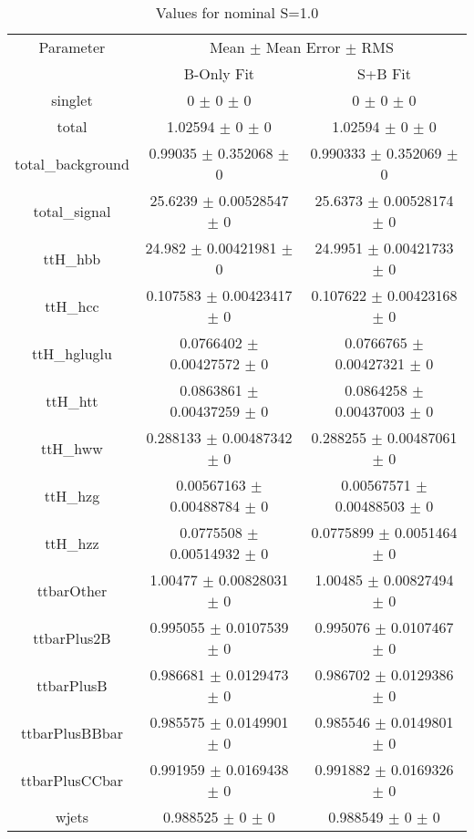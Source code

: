 \begin{table}
\centering
\caption{Values for nominal S=1.0}
\begin{tabular}{ccc}
\toprule
Parameter & \multicolumn{2}{c}{Mean $\pm$ Mean Error $\pm$ RMS}\\
 & B-Only Fit & S+B Fit\\
\midrule
singlet & \num{0} $\pm$ \num{0} $\pm$ \num{0} & \num{0} $\pm$ \num{0} $\pm$ \num{0}\\
total & \num{1.02594} $\pm$ \num{0} $\pm$ \num{0} & \num{1.02594} $\pm$ \num{0} $\pm$ \num{0}\\
total\_background & \num{0.99035} $\pm$ \num{0.352068} $\pm$ \num{0} & \num{0.990333} $\pm$ \num{0.352069} $\pm$ \num{0}\\
total\_signal & \num{25.6239} $\pm$ \num{0.00528547} $\pm$ \num{0} & \num{25.6373} $\pm$ \num{0.00528174} $\pm$ \num{0}\\
ttH\_hbb & \num{24.982} $\pm$ \num{0.00421981} $\pm$ \num{0} & \num{24.9951} $\pm$ \num{0.00421733} $\pm$ \num{0}\\
ttH\_hcc & \num{0.107583} $\pm$ \num{0.00423417} $\pm$ \num{0} & \num{0.107622} $\pm$ \num{0.00423168} $\pm$ \num{0}\\
ttH\_hgluglu & \num{0.0766402} $\pm$ \num{0.00427572} $\pm$ \num{0} & \num{0.0766765} $\pm$ \num{0.00427321} $\pm$ \num{0}\\
ttH\_htt & \num{0.0863861} $\pm$ \num{0.00437259} $\pm$ \num{0} & \num{0.0864258} $\pm$ \num{0.00437003} $\pm$ \num{0}\\
ttH\_hww & \num{0.288133} $\pm$ \num{0.00487342} $\pm$ \num{0} & \num{0.288255} $\pm$ \num{0.00487061} $\pm$ \num{0}\\
ttH\_hzg & \num{0.00567163} $\pm$ \num{0.00488784} $\pm$ \num{0} & \num{0.00567571} $\pm$ \num{0.00488503} $\pm$ \num{0}\\
ttH\_hzz & \num{0.0775508} $\pm$ \num{0.00514932} $\pm$ \num{0} & \num{0.0775899} $\pm$ \num{0.0051464} $\pm$ \num{0}\\
ttbarOther & \num{1.00477} $\pm$ \num{0.00828031} $\pm$ \num{0} & \num{1.00485} $\pm$ \num{0.00827494} $\pm$ \num{0}\\
ttbarPlus2B & \num{0.995055} $\pm$ \num{0.0107539} $\pm$ \num{0} & \num{0.995076} $\pm$ \num{0.0107467} $\pm$ \num{0}\\
ttbarPlusB & \num{0.986681} $\pm$ \num{0.0129473} $\pm$ \num{0} & \num{0.986702} $\pm$ \num{0.0129386} $\pm$ \num{0}\\
ttbarPlusBBbar & \num{0.985575} $\pm$ \num{0.0149901} $\pm$ \num{0} & \num{0.985546} $\pm$ \num{0.0149801} $\pm$ \num{0}\\
ttbarPlusCCbar & \num{0.991959} $\pm$ \num{0.0169438} $\pm$ \num{0} & \num{0.991882} $\pm$ \num{0.0169326} $\pm$ \num{0}\\
wjets & \num{0.988525} $\pm$ \num{0} $\pm$ \num{0} & \num{0.988549} $\pm$ \num{0} $\pm$ \num{0}\\
\bottomrule
\end{tabular}
\end{table}